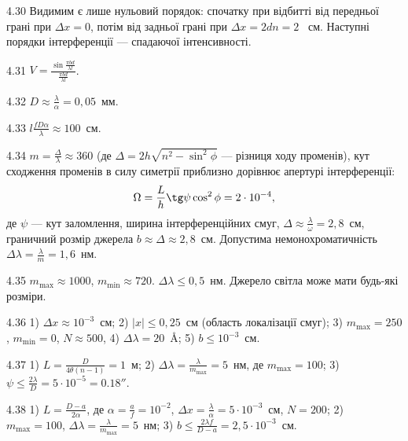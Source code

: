 \begin{Solution}{4.{30}}
	Видимим є лише нульовий порядок: спочатку при відбитті від передньої грані
	при $ \Delta x = 0 $, потім від задньої грані при $ \Delta  x = 2dn = 2 $~ см. Наступні порядки
	інтерференції --- спадаючої інтенсивності.
\end{Solution}
\begin{Solution}{4.{31}}
	$V = \frac{\sin\frac{\pi b d}{\lambda l}}{\frac{\pi b d}{\lambda l}}$.
\end{Solution}
\begin{Solution}{4.{32}}
	$D \approx \frac{\lambda}{\alpha} = 0,05$~мм.
\end{Solution}
\begin{Solution}{4.{33}}
	$ l \frac{fD\alpha}{\lambda} \approx 100$~см.
\end{Solution}
\begin{Solution}{4.{34}}
	$m = \frac{\Delta}{\lambda} \approx 360$ (де $\Delta = 2h\sqrt{n^2 - \sin^2\phi}$ --- різниця ходу променів), кут сходження променів в силу симетрії приблизно дорівнює апертурі інтерференції:
	\begin{equation*}
		\Omega = \frac{L}{h} \tg\psi\cos^2\phi = 2\cdot10^{-4},
	\end{equation*}
	де $\psi$ --- кут заломлення, ширина інтерференційних смуг, $\Delta \approx \frac{\lambda}{\omega} = 2,8$~см, граничний розмір джерела $b \approx \Delta \approx 2,8$~см. Допустима немонохроматичність
	$ \Delta\lambda =  \frac{\lambda}{m} = 1,6 $~нм.
\end{Solution}
\begin{Solution}{4.{35}}
	$ m_{\max} \approx 1000$, $ m_{\min} \approx 720 $. $ \Delta\lambda \le 0,5 $~нм. Джерело світла може мати будь-які розміри.
\end{Solution}
\begin{Solution}{4.{36}}
	1) $\Delta x \approx 10^{-3}$~см; 2) $|x| \le 0,25$~см (область локалізації смуг); 3) $ m_{\max} = 250$, $ m_{\min} = 0$, $N \approx 500$, 4) $\Delta\lambda = 20$~\AA; 5) $ b \le 10^{-3}$~см.
\end{Solution}
\begin{Solution}{4.{37}}
	1) $L = \frac{D}{4\theta (n - 1)} = 1$~м; 2) $ \Delta\lambda = \frac{\lambda}{m_{\max}} = 5$~нм, де $m_{\max} = 100$; 3) $\psi \le \frac{2\lambda}{D} = 5\cdot10^{-5} = 0.18''$.
\end{Solution}
\begin{Solution}{4.{38}}
	1) $L = \frac{D - a}{2\alpha}$, де $\alpha = \frac{a}{f} = 10^{-2}$, $ \Delta x  = \frac{\lambda}{\alpha} = 5\cdot10^{-3}$~см, $N = 200$; 2) $m_{\max} = 100$,  $ \Delta\lambda = \frac{\lambda}{m_{\max}} = 5$~нм; 3) $b \le \frac{2\lambda f}{D - a} = 2,5\cdot10^{-3}$~см.
\end{Solution}

